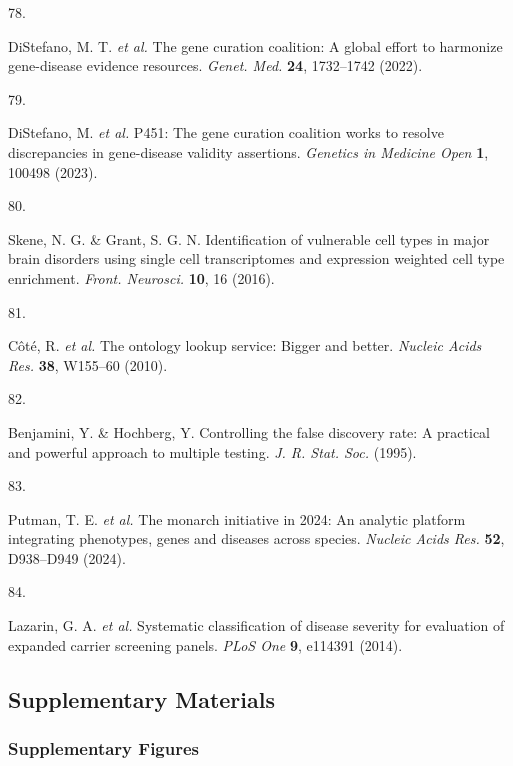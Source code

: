 \documentclass[
]{agujournal2019}
\newlength{\cslhangindent}
\newlength{\csllabelwidth}
\newenvironment{CSLReferences}[2] %
 {\begin{list}{}{%
  \setlength{\itemindent}{0pt}
  \setlength{\leftmargin}{0pt}
  \setlength{\parsep}{0pt}
  \ifodd #1
   \setlength{\leftmargin}{\cslhangindent}
   \setlength{\itemindent}{-1\cslhangindent}
  \fi
  \setlength{\itemsep}{#2\baselineskip}}}
 {\end{list}}
\newcommand{\CSLLeftMargin}[1]{\parbox[t]{\csllabelwidth}{\strut#1\strut}}
\newcommand{\CSLRightInline}[1]{\parbox[t]{\linewidth - \csllabelwidth}{\strut#1\strut}}
\begin{document}
\begin{CSLReferences}{0}{0}
\CSLLeftMargin{78. }%
\CSLRightInline{DiStefano, M. T. \emph{et al.} The gene curation
coalition: A global effort to harmonize gene-disease evidence resources.
\emph{Genet. Med.} \textbf{24}, 1732--1742 (2022).}

\CSLLeftMargin{79. }%
\CSLRightInline{DiStefano, M. \emph{et al.} P451: The gene curation
coalition works to resolve discrepancies in gene-disease validity
assertions. \emph{Genetics in Medicine Open} \textbf{1}, 100498 (2023).}

\CSLLeftMargin{80. }%
\CSLRightInline{Skene, N. G. \& Grant, S. G. N. Identification of
vulnerable cell types in major brain disorders using single cell
transcriptomes and expression weighted cell type enrichment.
\emph{Front. Neurosci.} \textbf{10}, 16 (2016).}

\CSLLeftMargin{81. }%
\CSLRightInline{Côté, R. \emph{et al.} The ontology lookup service:
Bigger and better. \emph{Nucleic Acids Res.} \textbf{38}, W155--60
(2010).}

\CSLLeftMargin{82. }%
\CSLRightInline{Benjamini, Y. \& Hochberg, Y. Controlling the false
discovery rate: A practical and powerful approach to multiple testing.
\emph{J. R. Stat. Soc.} (1995).}

\CSLLeftMargin{83. }%
\CSLRightInline{Putman, T. E. \emph{et al.} The monarch initiative in
2024: An analytic platform integrating phenotypes, genes and diseases
across species. \emph{Nucleic Acids Res.} \textbf{52}, D938--D949
(2024).}

\CSLLeftMargin{84. }%
\CSLRightInline{Lazarin, G. A. \emph{et al.} Systematic classification
of disease severity for evaluation of expanded carrier screening panels.
\emph{PLoS One} \textbf{9}, e114391 (2014).}

\end{CSLReferences}

\hfill\break

\newpage{}

\subsection{Supplementary Materials}\label{supplementary-materials}

\subsubsection{Supplementary Figures}\label{supplementary-figures}
\end{document}
